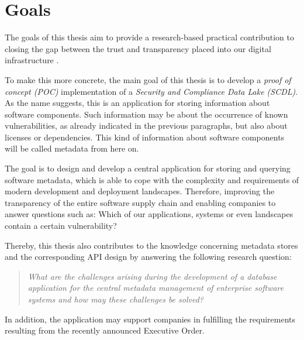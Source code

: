 \section{Goals}
The goals of this thesis aim to provide a research-based practical contribution to closing the gap between the trust and transparency placed into our digital infrastructure \cite{ExecutiveOrderSBOM}.\par 
To make this more concrete, the main goal of this thesis is to develop a \textit{proof of concept (POC)} implementation of a \textit{Security and Compliance Data Lake (SCDL)}. As the name suggests, this is an application for storing information about software components. Such information may be about the occurrence of known vulnerabilities, as already indicated in the previous paragraphs, but also about licenses or dependencies. This kind of information about software components will be called metadata from here on.\par
The goal is to design and develop a central application for storing and querying software metadata, which is able to cope with the complexity and requirements of modern development and deployment landscapes. Therefore, improving the transparency of the entire software supply chain and enabling companies to answer questions such as: Which of our applications, systems or even landscapes contain a certain vulnerability?\par
Thereby, this thesis also contributes to the knowledge concerning metadata stores and the corresponding API design by answering the following research question:
\begin{quote}
	\emph{What are the challenges arising during the development of a database application for the central metadata management of enterprise software systems and how may these challenges be solved?}
\end{quote}

In addition, the application may support companies in fulfilling the requirements resulting from the recently announced Executive Order. 

